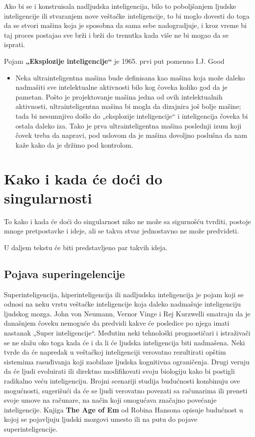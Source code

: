 \documentclass[a4paper]{article}
\begin{document}
Ako bi se i konstruisala nadljudska inteligencija, bilo to poboljšanjem ljudske inteligencije ili stvaranjem nove veštačke inteligencije, to bi moglo dovesti do toga da se stvori mašina koja je sposobna da sama sebe nadogradjuje, i kroz vreme bi taj proces postajao sve brži i brži do trenutka kada više ne bi mogao da se isprati.

Pojam \textbf{„Eksplozije inteligencije“} je 1965. prvi put pomenuo I.J. Good\cite{ref 3}

\begin{itemize}
\item Neka ultrainteligentna mašina bude definisana kao mašina koja može daleko nadmašiti sve intelektualne aktivnosti bilo kog čoveka koliko god da je pametan. Pošto je projektovanje mašina jedna od ovih intelektualnih aktivnosti, ultrainteligentna mašina bi mogla da dizajnira još bolje mašine; tada bi nesumnjivo došlo do „eksplozije inteligencije“ i inteligencija čoveka bi ostala daleko iza. Tako je prva ultrainteligentna mašina poslednji izum koji čovek treba da napravi, pod uslovom da je mašina dovoljno poslušna da nam kaže kako da je držimo pod kontrolom.
\end{itemize} 
\section{Kako i kada će doći do singularnosti}	
\label{sec:kakoikada}
To kako i kada će doći do singularnost niko ne može sa sigurnošću tvrditi, postoje mnoge pretpostavke i ideje, ali se takva stvar jednostavno ne može predvideti.

U daljem tekstu će biti predstavljeno par takvih ideja.
\subsection{Pojava superingelencije}

Superinteligencija, hiperinteligencija ili nadljudska inteligencija je pojam koji se odnosi na neku vrstu veštačke inteligencije koja daleko nadmašuje inteligenciju ljudskog mozga.  John von Neumann, Vernor Vinge i Rej Kurzwelli smatraju da je današnjem čoveku nemoguće da predvidi kakve će posledice po njega imati nastanak „Super inteligencije“.\cite{ref 4}\cite{ref 5}
Međutim neki tehnološki prognostičari i istraživači se ne slažu oko toga kada će i da li će ljudska inteligencija biti nadmašena.  Neki tvrde da će napredak u veštačkoj inteligenciji verovatno rezultirati opštim sistemima rasuđivanja koji zaobilaze ljudska kognitivna ograničenja. Drugi veruju da će ljudi evoluirati ili direktno modifikovati svoju biologiju kako bi postigli radikalno veću inteligenciju.\cite{ref 6}\cite{ref 7}
Brojni scenariji studija budućnosti kombinuju ove mogućnosti, sugerišući da će se ljudi verovatno povezati sa računarima ili preneti svoje umove na računare, na način koji omogućava značajno povećanje inteligencije. Knjiga \textbf{The Age of Em} od Robina Hansona opisuje budućnost u kojoj se pojavljuju ljudski mozgovi umesto ili na putu do pojave superinteligencije.\cite{ref 8}
\end{document}
